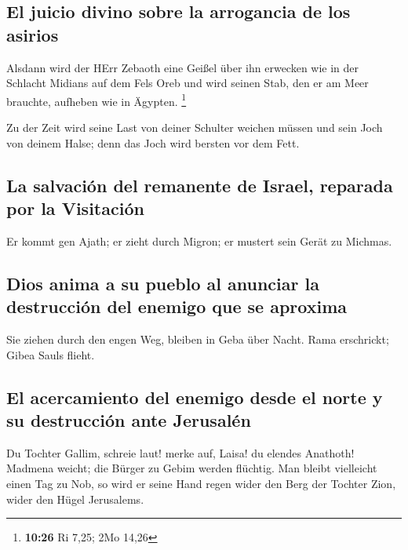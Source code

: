 \hypertarget{el-juicio-divino-sobre-la-arrogancia-de-los-asirios}{%
\subsection{El juicio divino sobre la arrogancia de los
asirios}\label{el-juicio-divino-sobre-la-arrogancia-de-los-asirios}}

 Alsdann wird der HErr Zebaoth eine Geißel über ihn
erwecken wie in der Schlacht Midians auf dem Fels Oreb und wird seinen
Stab, den er am Meer brauchte, aufheben wie in Ägypten. \footnote{\textbf{10:26}
  Ri 7,25; 2Mo 14,26}

 Zu der Zeit wird seine Last von deiner Schulter weichen
müssen und sein Joch von deinem Halse; denn das Joch wird bersten vor
dem Fett.

\hypertarget{la-salvaciuxf3n-del-remanente-de-israel-reparada-por-la-visitaciuxf3n}{%
\subsection{La salvación del remanente de Israel, reparada por la
Visitación}\label{la-salvaciuxf3n-del-remanente-de-israel-reparada-por-la-visitaciuxf3n}}

 Er kommt gen Ajath; er zieht durch Migron; er mustert
sein Gerät zu Michmas.

\hypertarget{dios-anima-a-su-pueblo-al-anunciar-la-destrucciuxf3n-del-enemigo-que-se-aproxima}{%
\subsection{Dios anima a su pueblo al anunciar la destrucción del
enemigo que se
aproxima}\label{dios-anima-a-su-pueblo-al-anunciar-la-destrucciuxf3n-del-enemigo-que-se-aproxima}}

 Sie ziehen durch den engen Weg, bleiben in Geba über
Nacht. Rama erschrickt; Gibea Sauls flieht.

\hypertarget{el-acercamiento-del-enemigo-desde-el-norte-y-su-destrucciuxf3n-ante-jerusaluxe9n}{%
\subsection{El acercamiento del enemigo desde el norte y su destrucción
ante
Jerusalén}\label{el-acercamiento-del-enemigo-desde-el-norte-y-su-destrucciuxf3n-ante-jerusaluxe9n}}

 Du Tochter Gallim, schreie laut! merke auf, Laisa! du
elendes Anathoth!  Madmena weicht; die Bürger zu Gebim
werden flüchtig.  Man bleibt vielleicht einen Tag zu Nob,
so wird er seine Hand regen wider den Berg der Tochter Zion, wider den
Hügel Jerusalems.

